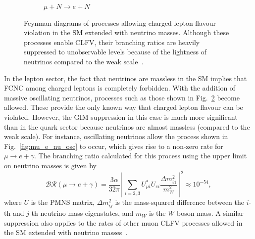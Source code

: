 \begin{figure}
\begin{subfigure}[t]{0.45\textwidth}
    \caption{
        $\mu+N \rightarrow e + N$
    }
    \label{fig:mu-e_conv_SM}
\end{subfigure}
    \caption{
        Feynman diagrams of processes allowing charged lepton flavour
        violation in the SM extended with neutrino masses. Although these
        processes enable CLFV, their branching ratios are heavily suppressed to
        unobservable levels because of the lightness of
        neutrinos compared to the weak scale~\cite{BERNSTEIN201327}.}
    \label{fig:lepton_fcnc}
\end{figure}

In the lepton sector, the fact that neutrinos are massless in the SM implies
that FCNC among charged leptons is completely forbidden. With the addition of
massive oscillating neutrinos, processes such as those shown in
Fig.~\ref{fig:lepton_fcnc} become allowed. These provide the only known way that
charged lepton flavour can be violated. However, the GIM suppression in this case is
much more significant than in the quark sector because neutrinos are almost
massless (compared to the weak scale). For instance, oscillating neutrinos allow
the process shown in Fig.~\ref{fig:mu_e_nu_osc} to occur, which gives rise to a
non-zero rate for ${\mu \rightarrow e + \gamma}$. The branching ratio calculated
for this process using the upper limit on neutrino masses is given
by~\cite{BERNSTEIN201327}
\begin{equation}\label{eq:br_meg}
\mathcal{BR}(\mu \rightarrow e + \gamma) = \frac{3\alpha}{32\pi} \left|\ \sum_{i=2, 3} U^*_{\mu i} U_{e i} 
\frac{\Delta m^2_{i1}}{m^2_W}  \ \right| ^2 \approx 10^{-54},
\end{equation}
where $U$ is the PMNS matrix, $\Delta m^2_{ij}$ is the mass-squared difference
between the $i$-th and $j$-th neutrino mass eigenstates, and $m_W$ is the
$W$-boson mass. 
A similar suppression also applies to the rates of other muon CLFV processes allowed in the
SM extended with neutrino masses~\cite{doi:10.1063/1.56214}.

